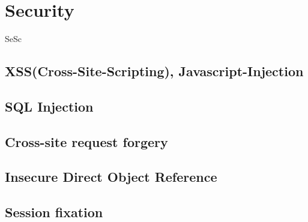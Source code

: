 \chapter{Security}
\begin{tiny}
	SeSc
\end{tiny}

\section{XSS(Cross-Site-Scripting), Javascript-Injection}


\section{SQL Injection}



\section{Cross-site request forgery}



\section{Insecure Direct Object Reference}



\section{Session fixation}

